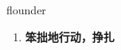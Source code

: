 
\begin{frame}
{\huge flounder}
\begin{center}
\begin{enumerate}\Large
  \item \textbf{笨拙地行动，挣扎}
\end{enumerate}
\end{center}
\end{frame}
